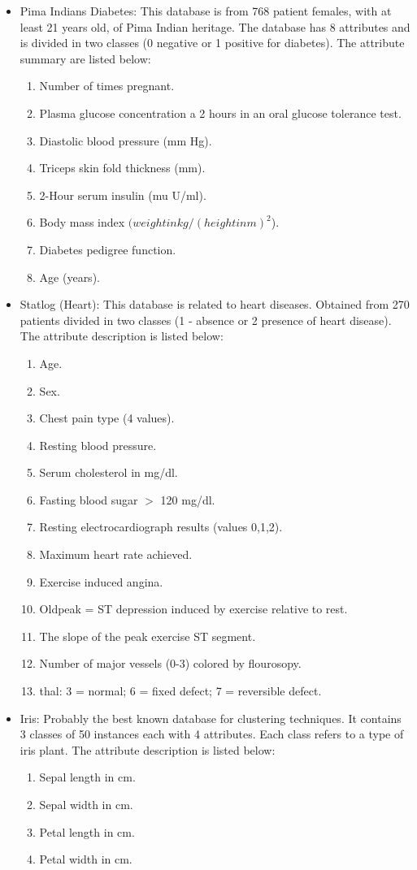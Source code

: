 \documentclass[journal]{IEEEtran}
\begin{document}
\begin{itemize}
	\item Pima Indians Diabetes: This database is from 768 patient females, with at least 21 years old, of Pima Indian heritage. The database has 8 attributes and is divided in two classes (0 negative or 1 positive for diabetes). The attribute summary are listed below:
	\begin{enumerate}
		\item Number of times pregnant.
		\item Plasma glucose concentration a 2 hours in an oral glucose tolerance test.
		\item  Diastolic blood pressure (mm Hg).
		\item  Triceps skin fold thickness (mm).
		\item  2-Hour serum insulin (mu U/ml).
		\item Body mass index $(weight in kg/(height in m)^2$).
		\item Diabetes pedigree function.
		\item Age (years).
	\end{enumerate}
	\item Statlog (Heart): This database is related to heart diseases. Obtained from 270 patients divided in two classes (1 - absence or 2 presence of heart disease). The attribute description is listed below:
	\begin{enumerate}
		\item Age.
		\item Sex.
		\item Chest pain type (4 values).
		\item Resting blood pressure.
		\item Serum cholesterol in mg/dl. 
		\item Fasting blood sugar $>$ 120 mg/dl.
		\item Resting electrocardiograph results (values 0,1,2).
		\item Maximum heart rate achieved.
		\item Exercise induced angina.
		\item Oldpeak = ST depression induced by exercise relative to rest.
		\item The slope of the peak exercise ST segment. 
		\item Number of major vessels (0-3) colored by flourosopy.
		\item thal: 3 = normal; 6 = fixed defect; 7 = reversible defect. 
	\end{enumerate}
	\item Iris: Probably the best known database for clustering techniques. It contains 3 classes of 50 instances each with 4 attributes. Each class refers to a type of iris plant. The attribute description is listed below:
	\begin{enumerate}
		\item Sepal length in cm.
		\item Sepal width in cm.
		\item Petal length in cm.
		\item Petal width in cm.
	\end{enumerate}
	

\end{itemize}
\end{document}
